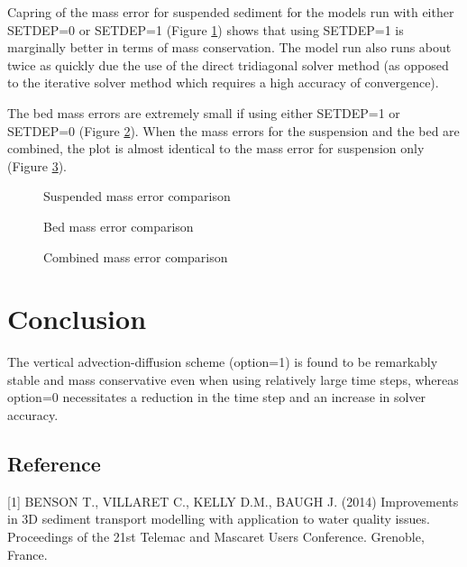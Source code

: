 Capring of the mass error for suspended sediment for the models run with either SETDEP=0 or SETDEP=1 
(Figure \ref{susmasserr}) shows that using SETDEP=1 is marginally better in terms of mass conservation. 
The model run also runs about twice as quickly due the use of the direct tridiagonal solver method 
(as opposed to the iterative solver method which requires a high accuracy of convergence).

The bed mass errors are extremely small if using either SETDEP=1 or SETDEP=0 (Figure \ref{bedmasserr}). When
the mass errors for the suspension and the bed are combined, the plot is almost identical to the mass
error for suspension only (Figure \ref{totmasserr}).

\begin{figure} [h]
\centering
{}
\caption{Suspended mass error comparison}\label{susmasserr}
\end{figure}

\begin{figure} [h]
\centering
{}
\caption{Bed mass error comparison}\label{bedmasserr}
\end{figure}

\begin{figure} [h]
\centering
{}
\caption{Combined mass error comparison}\label{totmasserr}
\end{figure}


\section{Conclusion}
%
The vertical advection-diffusion scheme (option=1) is found to be remarkably 
stable and mass conservative even when using relatively large time steps, 
whereas option=0 necessitates a reduction in the time step and an increase in
solver accuracy.
%
%
%
%
\subsection{Reference}
%
[1] BENSON T., VILLARET C., KELLY D.M., BAUGH J. (2014) Improvements in 3D 
sediment transport modelling with application to water quality issues. 
Proceedings of the 21st Telemac and Mascaret Users Conference. Grenoble, France.
